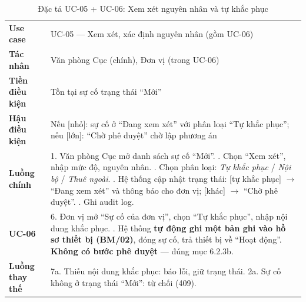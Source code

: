 \begin{table}[h]
\centering
\caption{Đặc tả UC-05 + UC-06: Xem xét nguyên nhân và tự khắc phục}
\label{tab:uc05}
\begin{tabular}{P{3.2cm}P{11.8cm}}
\toprule
\textbf{Use case} & UC-05 — Xem xét, xác định nguyên nhân (gồm UC-06) \\
\textbf{Tác nhân} & Văn phòng Cục (chính), Đơn vị (trong UC-06) \\
\textbf{Tiền điều kiện} & Tồn tại sự cố trạng thái ``Mới'' \\
\textbf{Hậu điều kiện} & Nếu [nhỏ]: sự cố ở ``Đang xem xét'' với phân loại ``Tự khắc phục''; nếu [lớn]: ``Chờ phê duyệt'' chờ lập phương án \\
\midrule
\textbf{Luồng chính} & 1. Văn phòng Cục mở danh sách sự cố ``Mới''. . Chọn ``Xem xét'', nhập mức độ, nguyên nhân. . Chọn phân loại: \emph{Tự khắc phục} / \emph{Nội bộ} / \emph{Thuê ngoài}. . Hệ thống cập nhật trạng thái: [tự khắc phục] $\rightarrow$ ``Đang xem xét'' và thông báo cho đơn vị; [khác] $\rightarrow$ ``Chờ phê duyệt''. . Ghi audit log. \\
\textbf{UC-06} & 6. Đơn vị mở ``Sự cố của đơn vị'', chọn ``Tự khắc phục'', nhập nội dung khắc phục. . Hệ thống \textbf{tự động ghi một bản ghi vào hồ sơ thiết bị (BM/02)}, đóng sự cố, trả thiết bị về ``Hoạt động''. \; \textbf{Không có bước phê duyệt} — đúng mục 6.2.3b. \\
\textbf{Luồng thay thế} & 7a. Thiếu nội dung khắc phục: báo lỗi, giữ trạng thái. \newline 2a. Sự cố không ở trạng thái ``Mới'': từ chối (409). \\
\bottomrule
\end{tabular}
\end{table}

